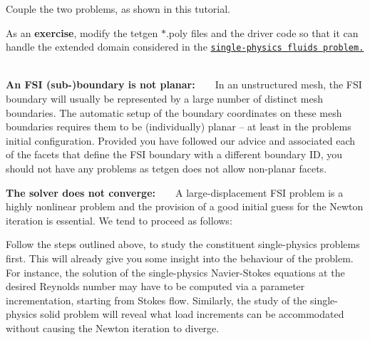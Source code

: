 \begin{DoxyItemize}
\begin{DoxyEnumerate}
\item Couple the two problems, as shown in this tutorial. ~\newline
~\newline

\end{DoxyEnumerate}As an {\bfseries exercise}, modify the tetgen {\ttfamily $\ast$.poly} files and the driver code so that it can handle the extended domain considered in the \href{../../../navier_stokes/unstructured_three_d_fluid/html/index.html#finer_mesh}{\tt single-\/physics fluids problem.} ~\newline
~\newline

\item {\bfseries  An F\+SI (sub-\/)boundary is not planar\+:} ~\newline
~\newline
 In an unstructured mesh, the F\+SI boundary will usually be represented by a large number of distinct mesh boundaries. The automatic setup of the boundary coordinates on these mesh boundaries requires them to be (individually) planar -- at least in the problem\textquotesingle{}s initial configuration. Provided you have followed our advice and associated each of the facets that define the F\+SI boundary with a different boundary ID, you should not have any problems as {\ttfamily tetgen} does not allow non-\/planar facets. ~\newline
~\newline

\item {\bfseries  The solver does not converge\+:} ~\newline
~\newline
 A large-\/displacement F\+SI problem is a highly nonlinear problem and the provision of a good initial guess for the Newton iteration is essential. We tend to proceed as follows\+: ~\newline
~\newline

\begin{DoxyEnumerate}
\item Follow the steps outlined above, to study the constituent single-\/physics problems first. This will already give you some insight into the behaviour of the problem. For instance, the solution of the single-\/physics Navier-\/\+Stokes equations at the desired Reynolds number may have to be computed via a parameter incrementation, starting from Stokes flow. Similarly, the study of the single-\/physics solid problem will reveal what load increments can be accommodated without causing the Newton iteration to diverge. ~\newline
~\newline


\end{DoxyEnumerate}
\end{DoxyItemize}
